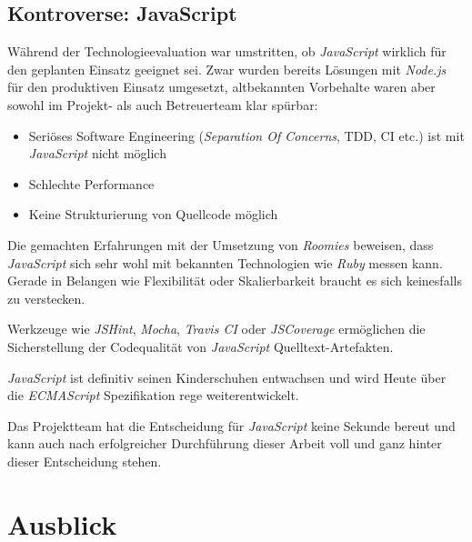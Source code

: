 \subsection*{Kontroverse: JavaScript}
Während der Technologieevaluation war umstritten, ob \emph{JavaScript} wirklich für den geplanten Einsatz geeignet sei. Zwar wurden bereits Lösungen mit \emph{Node.js} für den produktiven Einsatz umgesetzt, altbekannten Vorbehalte waren aber sowohl im Projekt- als auch Betreuerteam klar spürbar:

\begin{itemize}
	\item Seriöses Software Engineering (\emph{Separation Of Concerns}, \gls{TDD}, CI etc.) ist mit \emph{JavaScript} nicht möglich
	\item Schlechte Performance
	\item Keine Strukturierung von Quellcode möglich
\end{itemize}

Die gemachten Erfahrungen mit der Umsetzung von \emph{Roomies} beweisen, dass \emph{JavaScript} sich sehr wohl mit bekannten Technologien wie \emph{Ruby} messen kann. Gerade in Belangen wie Flexibilität oder Skalierbarkeit braucht es sich keinesfalls zu verstecken.

Werkzeuge wie \emph{JSHint}, \emph{Mocha}, \emph{Travis CI} oder \emph{JSCoverage} ermöglichen die Sicherstellung der Codequalität von \emph{JavaScript} Quelltext-Artefakten.

\emph{JavaScript} ist definitiv seinen Kinderschuhen entwachsen und wird Heute über die \emph{ECMAScript} Spezifikation rege weiterentwickelt.

Das Projektteam hat die Entscheidung für \emph{JavaScript} keine Sekunde bereut und kann auch nach erfolgreicher Durchführung dieser Arbeit voll und ganz hinter dieser Entscheidung stehen.


\section*{Ausblick}


